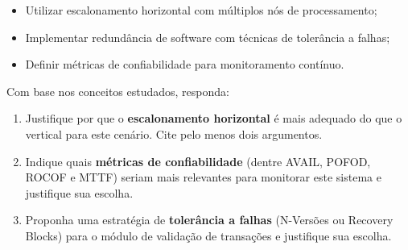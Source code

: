 \documentclass[12pt,a4paper]{article}
\newcommand{\resposta}[1]{
\noindent
\framebox[\textwidth]{
\begin{minipage}{0.98\textwidth}
\vspace*{#1}\null
\end{minipage}
}
}
\begin{document}
\begin{itemize}
    \item Utilizar escalonamento horizontal com múltiplos nós de processamento;
    \item Implementar redundância de software com técnicas de tolerância a falhas;
    \item Definir métricas de confiabilidade para monitoramento contínuo.
\end{itemize}

\vspace{0.2cm}

Com base nos conceitos estudados, responda:

\begin{enumerate}[label=\textbf{\alph*)}]
    \item Justifique por que o \textbf{escalonamento horizontal} é mais adequado do que o vertical para este cenário. Cite pelo menos dois argumentos.
    \item Indique quais \textbf{métricas de confiabilidade} (dentre AVAIL, POFOD, ROCOF e MTTF) seriam mais relevantes para monitorar este sistema e justifique sua escolha.
    \item Proponha uma estratégia de \textbf{tolerância a falhas} (N-Versões ou Recovery Blocks) para o módulo de validação de transações e justifique sua escolha.
\end{enumerate}

\vspace{0.2cm}
\resposta{8cm}
\end{document}
